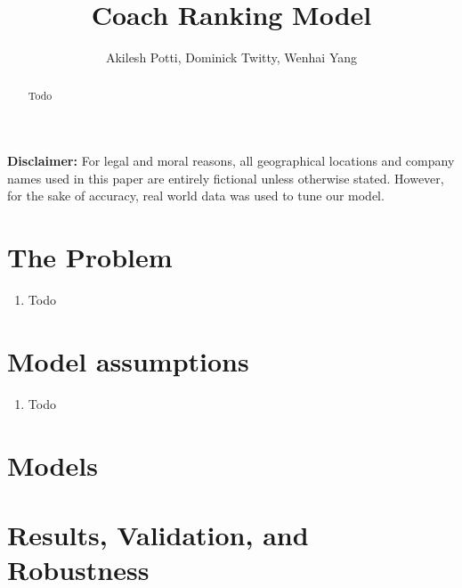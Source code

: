 \documentclass[titlepage]{article}
\begin{document}
\title{Coach Ranking Model}
\author{Akilesh Potti, Dominick Twitty, Wenhai Yang}
\maketitle

\begin{abstract}
Todo
\end{abstract}



\noindent\textbf{Disclaimer:} For legal and moral reasons, all geographical locations and company names used in this paper are entirely fictional unless otherwise stated. However, for the sake of accuracy, real world data was used to tune our model.


\section{The Problem}
\begin{enumerate}
\item Todo
\end{enumerate}


\section{Model assumptions}
\begin{enumerate}
\item Todo
\end{enumerate}

\section{Models}


\section{Results, Validation, and Robustness}
\end{document}
